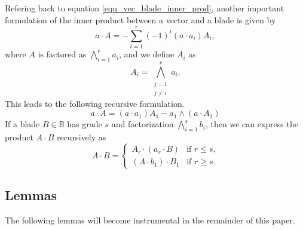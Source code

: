 \documentclass{birkjour}
\theoremstyle{definition}
\theoremstyle{remark}
\numberwithin{equation}{section}
\newcommand{\B}{\mathbb{B}}
\begin{document}
Refering back to equation \eqref{equ_vec_blade_inner_prod}, another important formulation of the inner product between a vector and a blade
is given by
\begin{equation}\label{equ_vec_blade_inner_prod_series}
a\cdot A=-\sum_{i=1}^r(-1)^i(a\cdot a_i)A_i,
\end{equation}
where $A$ is factored as $\bigwedge_{i=1}^r a_i$, and we define $A_i$ as
\begin{equation}\label{equ_A_i}
A_i=\bigwedge_{\substack{j=1\\j\neq i}}^r a_i.
\end{equation}
This leads to the following recursive formulation.
\begin{equation}
a\cdot A = (a\cdot a_1)A_1-a_1\wedge(a\cdot A_1)
\end{equation}
If a blade $B\in\B$ has grade $s$ and factorization $\bigwedge_{i=1}^s b_i$, then we can express
the product $A\cdot B$ recursively as
\begin{equation}
A\cdot B = \left\{\begin{array}{ll}
A_r\cdot(a_r\cdot B) & \mbox{if $r\leq s$,} \\
(A\cdot b_1)\cdot B_1 & \mbox{if $r\geq s$.}
\end{array}\right.
\end{equation}

\subsection{Lemmas}

The following lemmas will become instrumental in the remainder of this paper.
\end{document}
